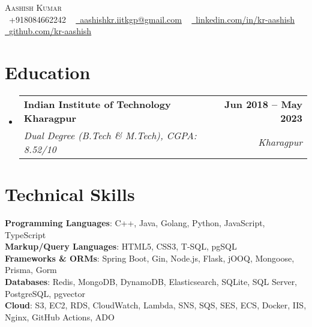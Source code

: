 \documentclass[letterpaper,11pt]{article}
\makeatletter
\newcommand{\resumeSubheading}[4]{
  \vspace{-2pt}\item
    \begin{tabular*}{1.0\textwidth}[t]{l@{\extracolsep{\fill}}r}
      \textbf{#1} & \textbf{\small #2} \\
      \textit{\small#3} & \textit{\small #4} \\
    \end{tabular*}\vspace{-7pt}
}
\newcommand{\resumeSubHeadingListStart}{\begin{itemize}[leftmargin=0.0in, label={}]}
\newcommand{\resumeSubHeadingListEnd}{\end{itemize}}
\makeatother
\begin{document}

\begin{center}
    {\Huge \scshape Aashish Kumar} \\ \vspace{1pt}
    \small \raisebox{-0.1\height}\faPhone\ +918084662242 ~ \href{mailto:aashishkr.iitkgp@gmail.com}{\raisebox{-0.2\height}\faEnvelope\  \underline{aashishkr.iitkgp@gmail.com}} ~ 
    \href{https://www.linkedin.com/in/kr-aashish/}{\raisebox{-0.2\height}\faLinkedin\ \underline{linkedin.com/in/kr-aashish}}  ~
    \href{https://github.com/kr-aashish}{\raisebox{-0.2\height}\faGithub\ \underline{github.com/kr-aashish}}
    \vspace{-8pt}
\end{center}


\section{Education}
  \resumeSubHeadingListStart
    \resumeSubheading
      {Indian Institute of Technology Kharagpur}{Jun 2018 -- May 2023}
      {Dual Degree (B.Tech \& M.Tech), CGPA: 8.52/10}{Kharagpur}
  \resumeSubHeadingListEnd


\section{Technical Skills}
\begin{flushleft}
\setlength{\leftskip}{0.15in}
\textbf{Programming Languages}{: C++, Java, Golang, Python, JavaScript, TypeScript} \\
\vspace{1pt}
\textbf{Markup/Query Languages}{: HTML5, CSS3, T‐SQL, pgSQL} \\
\vspace{1pt}
\textbf{Frameworks \& ORMs}{: Spring Boot, Gin, Node.js, Flask, jOOQ, Mongoose, Prisma, Gorm} \\
\vspace{1pt}
\textbf{Databases}{: Redis, MongoDB, DynamoDB, Elasticsearch, SQLite, SQL Server, PostgreSQL, pgvector} \\
\vspace{1pt}
\textbf{Cloud}{: S3, EC2, RDS, CloudWatch, Lambda, SNS, SQS, SES, ECS, Docker, IIS, Nginx, GitHub Actions, ADO}
\end{flushleft}
 \vspace{-16pt}
\end{document}
